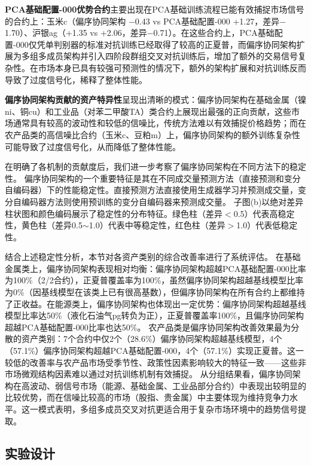 \textbf{PCA基础配置-000优势合约}主要出现在PCA基础训练流程已能有效捕捉市场信号的合约上：玉米c（偏序协同架构 $-$0.43 vs PCA基础配置-000 +1.27，差异$-$1.70）、沪银ag（+1.35 vs +2.06，差异$-$0.71）。在这些合约上，PCA基础配置-000仅凭单判别器的标准对抗训练已经取得了较高的正夏普，而偏序协同架构扩展为多组多成员架构并引入四阶段群组交叉对抗训练后，增加了额外的交易信号复杂性。在市场本身已具有较强可预测性的情况下，额外的架构扩展和对抗训练反而导致了过度信号化，稀释了整体性能。

\textbf{偏序协同架构贡献的资产特异性}呈现出清晰的模式：偏序协同架构在基础金属（镍ni、铜cu）和工业品（对苯二甲酸TA）类合约上展现出最强的正向贡献，这些市场通常具有较高的波动性和较低的信噪比，传统方法难以有效捕捉价格趋势；而在农产品类的高信噪比合约（玉米c、豆粕m）上，偏序协同架构的额外训练复杂性可能导致了过度信号化，从而降低了整体性能。

在明确了各机制的贡献度后，我们进一步考察了偏序协同架构在不同方法下的稳定性。
偏序协同架构的一个重要特征是其在不同成交量预测方法（直接预测和变分自编码器）下的性能稳定性。直接预测方法直接使用生成器学习并预测成交量，变分自编码器方法则使用预训练的变分自编码器来预测成交量。
子图(b)以绝对差异柱状图和颜色编码展示了稳定性的分布特征。绿色柱（差异$<$0.5）代表高稳定性，黄色柱（差异0.5$\sim$1.0）代表中等稳定性，红色柱（差异$>$1.0）代表低稳定性。

结合上述稳定性分析，本节对各资产类别的综合改善率进行了系统评估。
在基础金属类上，偏序协同架构表现相对均衡：偏序协同架构超越PCA基础配置-000比率为100\%（2/2合约），正夏普覆盖率为100\%，虽然偏序协同架构超越基线模型比率为0\%（因基线模型在该类上已有很高基数），但偏序协同架构在所有合约上都维持了正收益。在能源类上，偏序协同架构也体现出一定优势：偏序协同架构超越基线模型比率达50\%（液化石油气pg转负为正），正夏普覆盖率100\%，且偏序协同架构超越PCA基础配置-000比率也达50\%。
农产品类是偏序协同架构改善效果最为分散的资产类别：7个合约中仅2个（28.6\%）偏序协同架构超越基线模型，4个（57.1\%）偏序协同架构超越PCA基础配置-000，4个（57.1\%）实现正夏普。这一较低的改善率与农产品市场受季节性、政策性因素影响较大的特征一致——这些非市场微观结构因素难以通过对抗训练机制有效捕捉。
从分组结果看，偏序协同架构在高波动、弱信号市场（能源、基础金属、工业品部分合约）中表现出较明显的比较优势，而在信噪比较高的市场（股指、贵金属）中主要体现为维持竞争力水平。这一模式表明，多组多成员交叉对抗更适合用于复杂市场环境中的趋势信号提取。

\subsection{实验设计}

